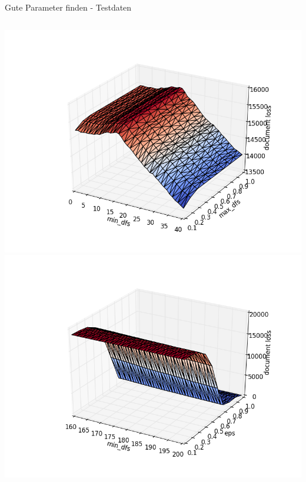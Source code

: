 \documentclass[compress,t]{beamer}
\begin{document}
\begin{frame}{Gute Parameter finden - Testdaten}

    \begin{columns}[t]
        \centering
        \includegraphics[width=1.0\textwidth]{img/df_3_cosin.png}\\
        \includegraphics[width=1.0\textwidth]{img/df_eps_1_cosin.png}
        \centering

\end{columns}
\end{frame}
\end{document}
